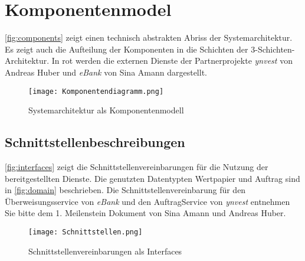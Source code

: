 \documentclass[12pt, a4paper, titlepage]{article}
\newcommand{\andi}[0]{Andreas Huber}
\newcommand{\andiProj}[0]{\textit{ynvest}}
\newcommand{\sina}[0]{Sina Amann}
\newcommand{\sinaProj}[0]{\textit{eBank}}
\begin{document}
\section{Komponentenmodel}
\autoref{fig:components} zeigt einen technisch abstrakten Abriss der
Systemarchitektur. Es zeigt auch die Aufteilung der Komponenten in die
Schichten der 3-Schichten-Architektur. In rot werden die externen Dienste
der Partnerprojekte \andiProj{} von \andi{} und \sinaProj{}
von \sina{} dargestellt.
\begin{figure}[H]
	\centering
    \texttt{[image: Komponentendiagramm.png]}
	\caption{Systemarchitektur als Komponentenmodell}
	\label{fig:components}
\end{figure}

\subsection{Schnittstellenbeschreibungen}
\autoref{fig:interfaces} zeigt die Schnittstellenvereinbarungen für die Nutzung
der bereitgestellten Dienste. Die genutzten Datentypten Wertpapier und Auftrag
sind in \autoref{fig:domain} beschrieben. Die Schnittstellenvereinbarung für
den Überweisungsservice von \sinaProj{} und den AuftragService von \andiProj{}
entnehmen Sie bitte dem 1. Meilenstein Dokument von \sina{} und \andi{}.
\label{subsec:Schnittstellen}
\begin{figure}[H]
	\centering
    \texttt{[image: Schnittstellen.png]}
	\caption{Schnittstellenvereinbarungen als Interfaces}
	\label{fig:interfaces}
\end{figure}
\end{document}
